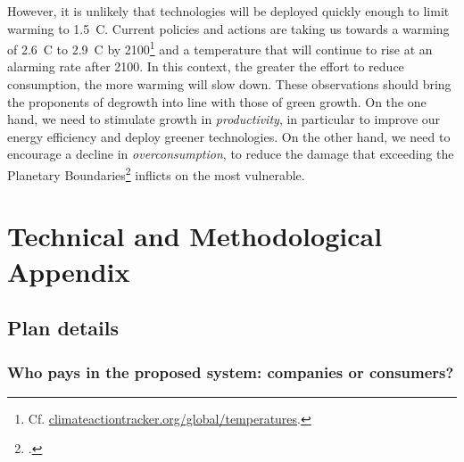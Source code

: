 \documentclass[a5paper,english,openany]{memoir}
\begin{document}
However, it is unlikely that technologies will be deployed quickly enough to limit warming to 1.5~\textdegree{}C. Current policies and actions are taking us towards a warming of 2.6~\textdegree{}C to 2.9~\textdegree{}C by 2100\footnote{Cf. \href{https://climateactiontracker.org/global/temperatures/}{climateactiontracker.org/global/temperatures}.} and a temperature that will continue to rise at an alarming rate after 2100. In this context, the greater the effort %
to reduce consumption, the more warming will slow %
down. 
These observations should bring the proponents of degrowth into line with those of green growth. On the one hand, we need to stimulate growth in \textit{productivity}, in particular to improve our energy efficiency and deploy greener technologies. On the other hand, we need to encourage a decline in \textit{overconsumption}, to reduce the damage that exceeding the Planetary Boundaries\footnote{\citet{rockstrom_safe_2009,steffen_planetary_2015-1,rockstrom_safe_2023}.} %
inflicts on the most vulnerable. 

\appendix

\part*{Technical and Methodological Appendix}\label{annex}

\chapter{Plan details\label{ch:details}} 

\section*{\normalsize Who pays in the proposed system: companies or consumers?}\label{q:incidence}
\end{document}

